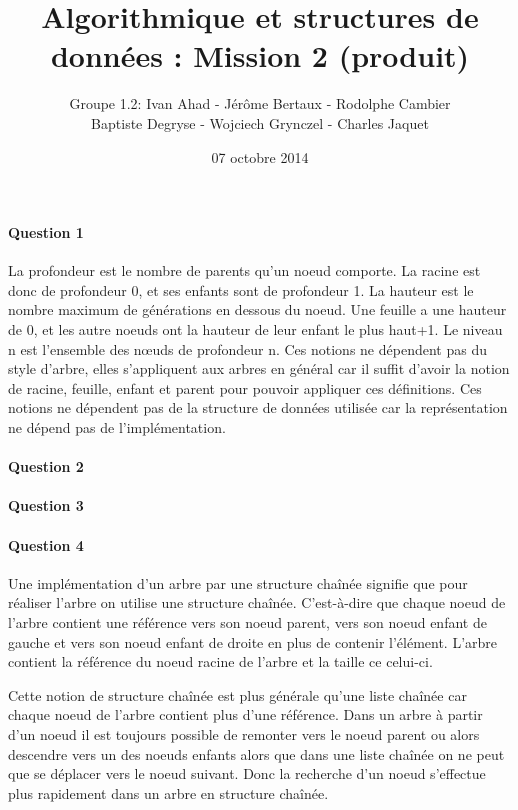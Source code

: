 \documentclass[a4paper]{article}
\title{Algorithmique et structures de données : Mission 2 (produit)}
\date{07 octobre 2014}
\author{Groupe 1.2: Ivan Ahad - Jérôme Bertaux - Rodolphe Cambier \\ 
	Baptiste Degryse - Wojciech Grynczel - Charles Jaquet}
\begin{document}
\maketitle
\paragraph{Question 1}
La profondeur est le nombre de parents qu’un noeud comporte. La racine est donc de profondeur 0, et ses enfants sont de profondeur 1. La hauteur est le nombre maximum de générations en dessous du noeud. Une feuille a une hauteur de 0, et les autre noeuds ont la hauteur de leur enfant le plus haut+1. Le niveau n est l’ensemble des nœuds de profondeur n. Ces notions ne dépendent pas du style d’arbre, elles s'appliquent aux arbres en général car il suffit d’avoir la notion de racine, feuille, enfant et parent pour pouvoir appliquer ces définitions. Ces notions ne dépendent pas de la structure de données utilisée car la représentation ne dépend pas de l’implémentation.

\paragraph{Question 2}

\paragraph{Question 3}

\paragraph{Question 4}

Une implémentation d’un arbre par une structure chaînée signifie que pour réaliser l’arbre on utilise une structure chaînée. C’est-à-dire que chaque noeud de l’arbre contient une référence vers son noeud parent, vers son noeud enfant de gauche et vers son noeud enfant de droite en plus de contenir l’élément. L’arbre contient la référence du noeud racine de l’arbre et la taille ce celui-ci. 

Cette notion de structure chaînée est plus générale qu’une liste chaînée car chaque noeud de l’arbre contient plus d’une référence. Dans un arbre à partir d’un noeud il est toujours possible de remonter vers le noeud parent ou alors descendre vers un des noeuds enfants alors que dans une liste chaînée on ne peut que se déplacer vers le noeud suivant. Donc la recherche d’un noeud s’effectue plus rapidement dans un arbre en structure chaînée.
\end{document}
